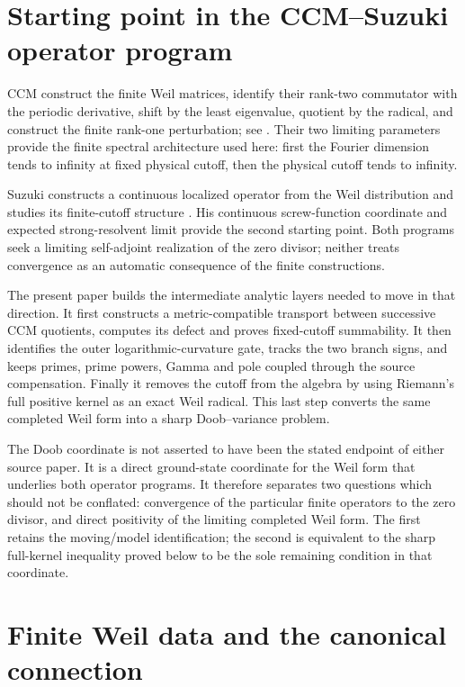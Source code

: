 \documentclass[11pt]{amsart}
\theoremstyle{definition}
\theoremstyle{remark}
\begin{document}
\section{Starting point in the CCM--Suzuki operator program}
\label{sec:boundary}

CCM construct the finite Weil matrices, identify their rank-two commutator
with the periodic derivative, shift by the least eigenvalue, quotient by the
radical, and construct the finite rank-one perturbation; see
\cite[Section~5, especially Lemma~5.4 and Theorem~5.10]{CCM}.  Their two
limiting parameters provide the finite spectral architecture used here:
first the Fourier dimension tends to infinity at fixed physical cutoff,
then the physical cutoff tends to infinity.

Suzuki constructs a continuous localized operator from the Weil
distribution and studies its finite-cutoff structure \cite{Suzuki}.  His
continuous screw-function coordinate and expected strong-resolvent limit
provide the second starting point.  Both programs seek a limiting
self-adjoint realization of the zero divisor; neither treats convergence as
an automatic consequence of the finite constructions.

The present paper builds the intermediate analytic layers needed to move in
that direction.  It first constructs a metric-compatible transport between
successive CCM quotients, computes its defect and proves fixed-cutoff
summability.  It then identifies the outer logarithmic-curvature gate,
tracks the two branch signs, and keeps primes, prime powers, Gamma and pole
coupled through the source compensation.  Finally it removes the cutoff
from the algebra by using Riemann's full positive kernel as an exact Weil
radical.  This last step converts the same completed Weil form into a sharp
Doob--variance problem.

The Doob coordinate is not asserted to have been the stated endpoint of
either source paper.  It is a direct ground-state coordinate for the Weil
form that underlies both operator programs.  It therefore separates two
questions which should not be conflated: convergence of the particular
finite operators to the zero divisor, and direct positivity of the limiting
completed Weil form.  The first retains the moving/model identification;
the second is equivalent to the sharp full-kernel inequality proved below
to be the sole remaining condition in that coordinate.

\section{Finite Weil data and the canonical connection}
\label{sec:finite}
\end{document}
